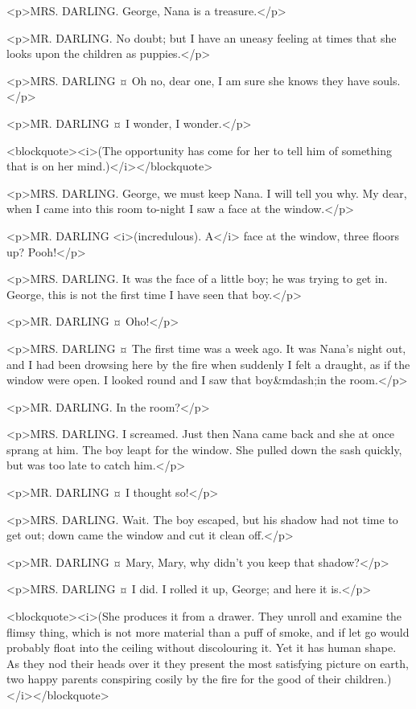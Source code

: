 <p>MRS. DARLING. George, Nana is a treasure.</p>

<p>MR. DARLING. No doubt; but I have an uneasy feeling at times that she looks upon the children as puppies.</p>

<p>MRS. DARLING ¤
Oh no, dear one, I am sure she knows they have souls.</p>

<p>MR. DARLING ¤
I wonder, I wonder.</p>

<blockquote><i>(The opportunity has come for her to tell him of something that is on her mind.)</i></blockquote>

<p>MRS. DARLING. George, we must keep Nana. I will tell you why.
My dear, when I came into this room to-night I saw a face at the window.</p>

<p>MR. DARLING <i>(incredulous). A</i> face at the window, three floors up? Pooh!</p>

<p>MRS. DARLING. It was the face of a little boy; he was trying to get in. George, this is not the first time I have seen that boy.</p>

<p>MR. DARLING ¤
Oho!</p>

<p>MRS. DARLING ¤
The first time was a week ago. It was Nana's night out, and I had been drowsing here by the fire when suddenly I felt a draught, as if the window were open. I looked round and I saw that boy&mdash;in the room.</p>

<p>MR. DARLING. In the room?</p>

<p>MRS. DARLING. I screamed. Just then Nana came back and she at once sprang at him. The boy leapt for the window. She pulled down the sash quickly, but was too late to catch him.</p>

<p>MR. DARLING ¤
I thought so!</p>

<p>MRS. DARLING. Wait. The boy escaped, but his shadow had not time to get out; down came the window and cut it clean off.</p>

<p>MR. DARLING ¤
Mary, Mary, why didn't you keep that shadow?</p>

<p>MRS. DARLING ¤
I did. I rolled it up, George; and here it is.</p>

<blockquote><i>(She produces it from a drawer. They unroll and examine the flimsy thing, which is not more material than a puff of smoke, and if let go would probably float into the ceiling without discolouring it. Yet it has human shape. As they nod their heads over it they present the most satisfying picture on earth, two happy parents conspiring cosily by the fire for the good of their children.)</i></blockquote>

